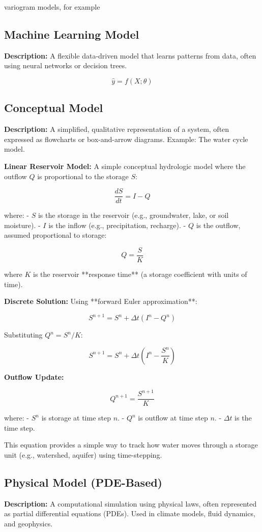 \documentclass{article}
\begin{document}
variogram models, for example


\subsection{Machine Learning Model}
\textbf{Description:} A flexible data-driven model that learns patterns from data, often using neural networks or decision trees.

\[
\hat{y} = f(X; \theta)
\]

\subsection{Conceptual Model}
\textbf{Description:} A simplified, qualitative representation of a system, often expressed as flowcharts or box-and-arrow diagrams. Example: The water cycle model.

\textbf{Linear Reservoir Model:} A simple conceptual hydrologic model where the outflow \( Q \) is proportional to the storage \( S \):

\[
\frac{dS}{dt} = I - Q
\]

where:
- \( S \) is the storage in the reservoir (e.g., groundwater, lake, or soil moisture).
- \( I \) is the inflow (e.g., precipitation, recharge).
- \( Q \) is the outflow, assumed proportional to storage: 

\[
Q = \frac{S}{K}
\]

where \( K \) is the reservoir **response time** (a storage coefficient with units of time).

\textbf{Discrete Solution:} Using **forward Euler approximation**:

\[
S^{n+1} = S^n + \Delta t (I^n - Q^n)
\]

Substituting \( Q^n = S^n / K \):

\[
S^{n+1} = S^n + \Delta t \left( I^n - \frac{S^n}{K} \right)
\]

\textbf{Outflow Update:}

\[
Q^{n+1} = \frac{S^{n+1}}{K}
\]

where:
- \( S^n \) is storage at time step \( n \).
- \( Q^n \) is outflow at time step \( n \).
- \( \Delta t \) is the time step.

This equation provides a simple way to track how water moves through a storage unit (e.g., watershed, aquifer) using time-stepping.

\subsection{Physical Model (PDE-Based)}
\textbf{Description:} A computational simulation using physical laws, often represented as partial differential equations (PDEs). Used in climate models, fluid dynamics, and geophysics.
\end{document}
